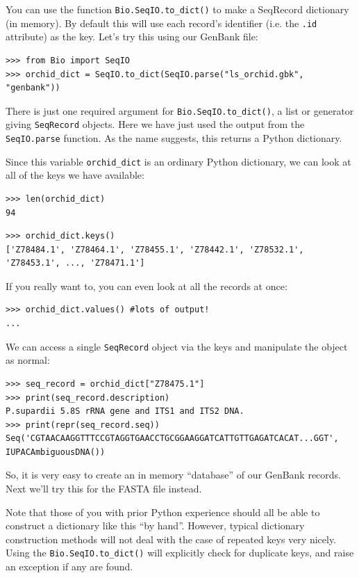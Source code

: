 \documentclass{report}
\begin{document}
You can use the function \verb|Bio.SeqIO.to_dict()| to make a SeqRecord dictionary
(in memory).  By default this will use each record's identifier (i.e. the \verb|.id|
attribute) as the key.  Let's try this using our GenBank file:

\begin{verbatim}
>>> from Bio import SeqIO
>>> orchid_dict = SeqIO.to_dict(SeqIO.parse("ls_orchid.gbk", "genbank"))
\end{verbatim}

There is just one required argument for \verb|Bio.SeqIO.to_dict()|, a list or
generator giving \verb|SeqRecord| objects. Here we have just used the output
from the \verb|SeqIO.parse| function. As the name suggests, this returns a
Python dictionary.

Since this variable \verb|orchid_dict| is an ordinary Python dictionary, we can look at all of the keys we have available:

\begin{verbatim}
>>> len(orchid_dict)
94
\end{verbatim}
\begin{verbatim}
>>> orchid_dict.keys()
['Z78484.1', 'Z78464.1', 'Z78455.1', 'Z78442.1', 'Z78532.1', 'Z78453.1', ..., 'Z78471.1']
\end{verbatim}

If you really want to, you can even look at all the records at once:
\begin{verbatim}
>>> orchid_dict.values() #lots of output!
...
\end{verbatim}

We can access a single \verb|SeqRecord| object via the keys and manipulate the object as normal:

\begin{verbatim}
>>> seq_record = orchid_dict["Z78475.1"]
>>> print(seq_record.description)
P.supardii 5.8S rRNA gene and ITS1 and ITS2 DNA.
>>> print(repr(seq_record.seq))
Seq('CGTAACAAGGTTTCCGTAGGTGAACCTGCGGAAGGATCATTGTTGAGATCACAT...GGT', IUPACAmbiguousDNA())
\end{verbatim}

So, it is very easy to create an in memory ``database'' of our GenBank records.  Next we'll try this for the FASTA file instead.

Note that those of you with prior Python experience should all be able to construct a dictionary like this ``by hand''.  However, typical dictionary construction methods will not deal with the case of repeated keys very nicely.  Using the \verb|Bio.SeqIO.to_dict()| will explicitly check for duplicate keys, and raise an exception if any are found.
\end{document}
